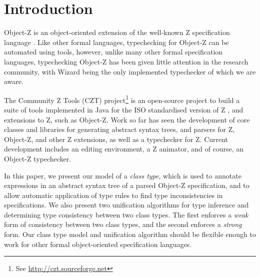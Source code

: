\section{Introduction}

Object-Z \cite{smith00} is an object-oriented extension of the
well-known Z specification language \cite{spivey92}.  Like other
formal languages, typechecking for Object-Z can be automated using
tools, however, unlike many other formal specification languages,
typechecking Object-Z has been given little attention in the research
community, with Wizard \cite{johnston96} being the only implemented
typechecker of which we are aware.

The Community Z Tools (CZT) project\footnote{See
\url{http://czt.sourceforge.net}} is an open-source project to build a
suite of tools implemented in Java for the ISO standardised version of
Z \cite{isoz}, and extensions to Z, such as Object-Z. Work so far has
seen the development of core classes and libraries for generating
abstract syntax trees, and parsers for Z, Object-Z, and other Z
extensions, as well as a typechecker for Z. Current development
includes an editing environment, a Z animator, and of course, an
Object-Z typechecker.

In this paper, we present our model of a {\em class type}, which is
used to annotate expressions in an abstract syntax tree of a parsed
Object-Z specification, and to allow automatic application of type
rules to find type inconsistencies in specifications. We also present
two unification algorithms for type inference and determining type
consistency between two class types. The first enforces a {\em weak}
form of consistency between two class types, and the second enforces a
{\em strong} form. Our class type model and unification algorithm
should be flexible enough to work for other formal object-oriented
specification languages.

